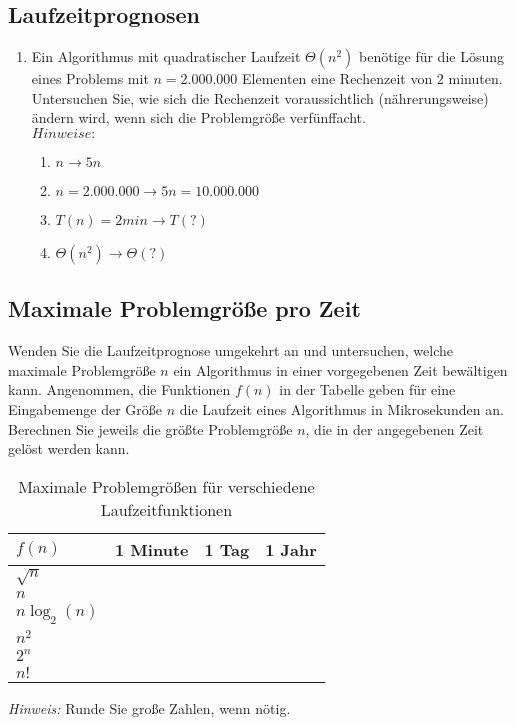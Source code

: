 \documentclass{article}
\begin{document}
\subsection{Laufzeitprognosen}
\begin{enumerate}[label=\alph*)]
    \item Ein Algorithmus mit quadratischer Laufzeit $\Theta(n^2)$ benötige für die Lösung eines Problems mit $n = 2.000.000$ Elementen eine Rechenzeit von $2$ minuten. Untersuchen Sie, wie sich die Rechenzeit voraussichtlich (nährerungs\-weise) ändern wird, wenn sich die Problemgröße verfünffacht.\vspace{1em}\\
    $Hinweise:$
    \begin{enumerate}[label=$\arabic*$:]
        \item $n \rightarrow 5n$
        \item $n = 2.000.000 \rightarrow 5n = 10.000.000$
        \item $T(n) = 2min \rightarrow T(?)$
        \item $\Theta(n^2) \rightarrow \Theta(?)$
    \end{enumerate}
\end{enumerate}
\subsection{Maximale Problemgröße pro Zeit}
Wenden Sie die Laufzeitprognose umgekehrt an und untersuchen, welche maximale Problemgröße $n$ ein Algorithmus in einer vorgegebenen Zeit bewältigen kann. Angenommen, die Funktionen $f(n)$ in der Tabelle geben für eine Eingabemenge der Größe $n$ die Laufzeit eines Algorithmus in Mikrosekunden an. Berechnen Sie jeweils die größte Problemgröße $n$, die in der angegebenen Zeit gelöst werden kann.
\begin{table}[h!]
    \centering
    \begin{tabular}{|l|c|c|c|}
        \hline
        $f(n)$ & \textbf{1 Minute} & \textbf{1 Tag} & \textbf{1 Jahr} \\ \hline
        $\sqrt{n}$ & & & \\ 
        $n$ & & & \\ 
        $n \log_2(n)$ & & & \\ 
        $n^2$ & & & \\ 
        $2^n$ & & & \\ 
        $n!$ & & & \\ \hline
    \end{tabular}
    \caption{Maximale Problemgrößen für verschiedene Laufzeitfunktionen}
\end{table}
\textit{Hinweis:} Runde Sie große Zahlen, wenn nötig.
\newpage
\end{document}
